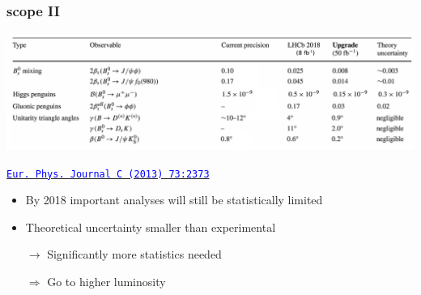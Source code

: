 \documentclass[table,xcolor=dvipsnames,professionalfonts]{beamer}
\newcommand{\myhref}[2]{\href{#1}{\footnotesize{\textcolor{blue}{\texttt{#2}}}}}
\begin{document}
    \begin{frame}
      \frametitle{scope II}
      \includegraphics[width=\textwidth]{./alessiotable.pdf}

      \myhref{https://doi.org/10.1140/epjc/s10052-013-2373-2}{Eur. Phys. Journal C (2013) 73:2373}

      \begin{itemize}
          \item By 2018 important analyses will still be statistically limited
          \item Theoretical uncertainty smaller than experimental
          \item[$\rightarrow$] Significantly more statistics needed
          \item[$\Rightarrow$] Go to higher luminosity
      \end{itemize}
    \end{frame}
\end{document}
